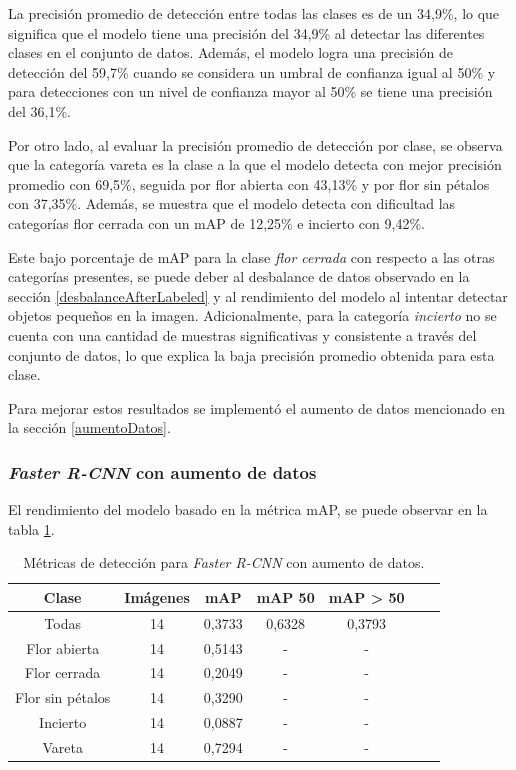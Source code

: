 La precisión promedio de detección entre todas las clases es de un 34,9\%, lo que significa que el modelo tiene una precisión del 34,9\% al detectar las diferentes clases en el conjunto de datos. Además, el modelo logra una precisión de detección del 59,7\% cuando se considera un umbral de confianza igual al 50\% y para detecciones con un nivel de confianza mayor al 50\% se tiene una precisión del 36,1\%.

Por otro lado, al evaluar la precisión promedio de detección por clase, se observa que la categoría vareta es la clase a la que el modelo detecta con mejor precisión promedio con 69,5\%, seguida por flor abierta con 43,13\% y por flor sin pétalos con 37,35\%. Además, se muestra que el modelo detecta con dificultad las categorías flor cerrada con un mAP de 12,25\% e incierto con 9,42\%.

Este bajo porcentaje de mAP para la clase \textit{flor cerrada} con respecto a las otras categorías presentes, se puede deber al desbalance de datos observado en la sección \ref{desbalanceAfterLabeled} y al rendimiento del modelo al intentar detectar objetos pequeños en la imagen. Adicionalmente, para la categoría \textit{incierto} no se cuenta con una cantidad de muestras significativas y consistente a través del conjunto de datos, lo que explica la baja precisión promedio obtenida para esta clase.

Para mejorar estos resultados se implementó el aumento de datos mencionado en la sección \ref{aumentoDatos}.

\subsubsection{\textit{Faster R-CNN} con aumento de datos}

El rendimiento del modelo basado en la métrica mAP, se puede observar en la tabla \ref{tab:resultadosFasterConAug}. 

\begin{table}[h]
	\centering
	\caption{Métricas de detección para \textit{Faster R-CNN} con aumento de datos.}
	\begin{tabular}{c c c c c c c}    
		\toprule
		\textbf{Clase}&\textbf{Imágenes}&\textbf{mAP}&\textbf{mAP 50}&\textbf{mAP > 50}\\
		\midrule
		Todas & 14 & 0,3733 & 0,6328 & 0,3793\\
		Flor abierta & 14 & 0,5143 & - & - \\
		Flor cerrada & 14 & 0,2049 & - & - \\
		Flor sin pétalos & 14 & 0,3290 & - & - \\
		Incierto & 14 & 0,0887 & - & - \\
		Vareta & 14 & 0,7294 & - & - \\		
		\bottomrule
		\hline
	\end{tabular}
	\label{tab:resultadosFasterConAug}
\end{table}

